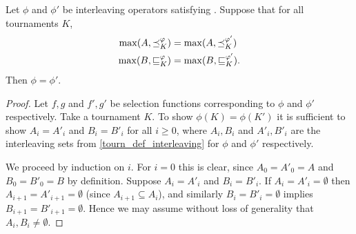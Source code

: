 \begin{proposition}
    \label{tourn_result_smi_maximal_ranks_equal}
    Let $\phi$ and $\phi'$ be interleaving operators satisfying \smi{}.
    Suppose that for all tournaments $K$,
    \begin{align*}
        \max(A, {\preceq_K^\varphi}) &= \max(A, \preceq_K^{\varphi'}) \\
        \max(B, {\sqsubseteq_K^\varphi}) &= \max(B, \sqsubseteq_K^{\varphi'}).
    \end{align*}
    Then $\phi = \phi'$.
\end{proposition}

\begin{proof}
    Let $f, g$ and $f', g'$ be selection functions corresponding to $\phi$
    and $\phi'$ respectively. Take a tournament $K$. To show $\phi(K) =
    \phi(K')$ it is sufficient to show $A_i = A'_i$ and $B_i = B'_i$ for all $i
    \ge 0$, where $A_i, B_i$ and $A'_i, B'_i$ are the interleaving sets from
    \cref{tourn_def_interleaving} for $\phi$ and $\phi'$ respectively.

    We proceed by induction on $i$. For $i = 0$ this is clear, since $A_0 =
    A'_0 = A$ and $B_0 = B'_0 = B$ by definition. Suppose $A_i = A'_i$ and $B_i
    = B'_i$. If $A_i = A'_i = \emptyset$ then $A_{i+1} = A'_{i+1} = \emptyset$
    (since $A_{i+1} \subseteq A_i$), and similarly $B_i = B'_i = \emptyset$
    implies $B_{i+1} = B'_{i+1} = \emptyset$. Hence we may assume without loss
    of generality that $A_i, B_i \ne \emptyset$.


\end{proof}
